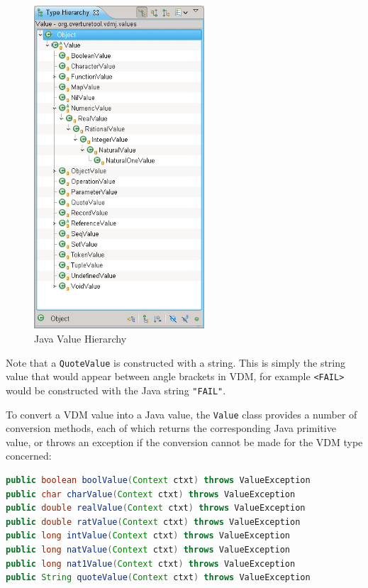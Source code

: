 \documentclass{overturerepchap}
\begin{document}
\begin{figure}[h]
\begin{center}
  \includegraphics[width=2.5in]{screenDumps/ValueHierarchy}
  \caption[labelInTOC]{Java Value Hierarchy}
  \label{fig:gui:JavaVDMhierarchy}
\end{center}
\end{figure}

Note that a \texttt{QuoteValue} is constructed with a string. This is simply the string value that would appear between angle brackets in VDM, for example \texttt{<FAIL>} would be constructed with the Java string \texttt{"FAIL"}.

To convert a VDM value into a Java value, the \texttt{Value} class provides a number of conversion methods, each of which returns the corresponding Java primitive value, or throws an exception if the conversion cannot be made for the VDM type concerned:

\begin{lstlisting}[language=JAVA]
public boolean boolValue(Context ctxt) throws ValueException
public char charValue(Context ctxt) throws ValueException
public double realValue(Context ctxt) throws ValueException
public double ratValue(Context ctxt) throws ValueException
public long intValue(Context ctxt) throws ValueException
public long natValue(Context ctxt) throws ValueException
public long nat1Value(Context ctxt) throws ValueException
public String quoteValue(Context ctxt) throws ValueException
\end{lstlisting}
\end{document}
